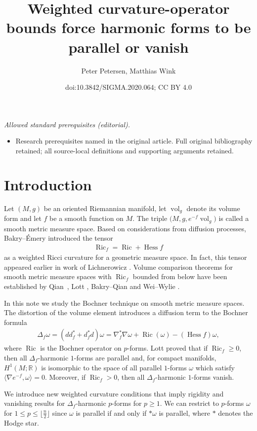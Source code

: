 \documentclass[10pt,a4paper]{amsart}
\title{Weighted curvature-operator bounds force harmonic forms to be parallel or vanish}
\author{Peter Petersen, Matthias Wink}
\date{doi:10.3842/SIGMA.2020.064; CC BY 4.0}
\numberwithin{equation}{section}
\newcommand{\vol}{\operatorname{vol}}
\newcommand{\Ric} {\operatorname{Ric}}
\newcommand{\Hess} {\operatorname{Hess}}
\newcommand{\R}{\mathbb{R}}
\begin{document}
\maketitle
\noindent\textit{Allowed standard prerequisites (editorial).}\begin{itemize}
\item Research prerequisites named in the original article. Full original bibliography retained; all source-local definitions and supporting arguments retained.
\end{itemize}\medskip
\section{Introduction}

Let $(M,g)$ be an oriented Riemannian manifold, let $\vol_g$ denote its volume form and let $f$ be a smooth function on $M$. The triple $\big(M,g, e^{-f} \vol_g\big)$ is called a smooth metric measure space. Based on considerations from diffusion processes, Bakry--\'Emery \cite{BakryEmeryDiffusion} introduced the tensor \begin{gather*}
\Ric_f = \Ric + \Hess f
\end{gather*}
as a weighted Ricci curvature for a geometric measure space. In fact, this tensor appeared earlier in work of Lichnerowicz \cite{LichnerowiczBETensor}. Volume comparison theorems for smooth metric measure spaces with $\Ric_f$ bounded from below have been established by Qian~\cite{QianEstimatesWeightedVolume}, Lott \cite{LottGeometryBETensor}, Bakry--Qian \cite{BakryQianVolumeComparison} and Wei--Wylie \cite{WeiWylieComparosionGeoBE}.

In this note we study the Bochner technique on smooth metric measure spaces. The distortion of the volume element introduces a diffusion term to the Bochner formula
\begin{gather*}
\Delta_f \omega = ( d d^{*}_f + d^{*}_f d) \omega= \nabla^{*}_f \nabla \omega + \Ric(\omega) - ( \Hess f ) \omega,
\end{gather*}
where $\Ric$ is the Bochner operator on $p$-forms. Lott \cite{LottGeometryBETensor} proved that if $\Ric_f \geq 0$, then all $\Delta_f$-harmonic $1$-forms are parallel and, for compact manifolds, $H^1(M;\R)$ is isomorphic to the space of all parallel $1$-forms $\omega$ which satisfy $\big\langle \nabla e^{-f}, \omega \big\rangle = 0$. Moreover, if $\Ric_f > 0$, then all $\Delta_f$-harmonic $1$-forms vanish.

We introduce new weighted curvature conditions that imply rigidity and vanishing results for $\Delta_f$-harmonic $p$-forms for $p \geq 1$. We can restrict to $p$-forms $\omega$ for $1 \leq p \leq \big\lfloor \frac{n}{2}\big\rfloor$ since $\omega$ is parallel if and only if $\ast \omega$ is parallel, where $\ast$ denotes the Hodge star.
\end{document}
